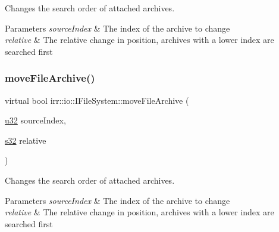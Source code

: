 Changes the search order of attached archives. 


\begin{DoxyParams}{Parameters}
{\em source\+Index} & The index of the archive to change \\
\hline
{\em relative} & The relative change in position, archives with a lower index are searched first \\
\hline
\end{DoxyParams}
\mbox{\label{classirr_1_1io_1_1IFileSystem_ae8530fb9793373cf4dbee956090e99f6}} 
\subsubsection{\texorpdfstring{move\+File\+Archive()}{moveFileArchive()}\hspace{0.1cm}{\footnotesize\ttfamily [2/2]}}
{\footnotesize\ttfamily virtual bool irr\+::io\+::\+I\+File\+System\+::move\+File\+Archive (\begin{DoxyParamCaption}\item[{\hyperlink{namespaceirr_a0416a53257075833e7002efd0a18e804}{u32}}]{source\+Index,  }\item[{\hyperlink{namespaceirr_ac66849b7a6ed16e30ebede579f9b47c6}{s32}}]{relative }\end{DoxyParamCaption})\hspace{0.3cm}{\ttfamily [pure virtual]}}



Changes the search order of attached archives. 


\begin{DoxyParams}{Parameters}
{\em source\+Index} & The index of the archive to change \\
\hline
{\em relative} & The relative change in position, archives with a lower index are searched first \\
\hline
\end{DoxyParams}
\mbox{\label{classirr_1_1io_1_1IFileSystem_aa509623756c9bcbc3a9bcf455ea2a3ba}} 
